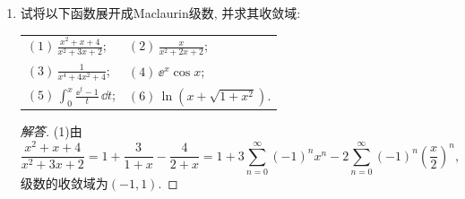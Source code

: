\begin{quiza}
\begin{enumerate}
\begin{proof}[解答]
其形式求导级数为
\[
\sum_{n=1}^{\infty}na_nx^{n-1}
=\sum_{n=1}^{\infty}\frac{(-1)^{n-1}}{n}x^{n-1}.
\]
当 \(x=1\) 时为交错调和级数, 收敛; 当 \(x=-1\) 时为
\[
-\sum_{n=1}^{\infty}\frac1n,
\]
发散. 因此该导数级数的收敛域正是 \(\left(-1,1\right]\).

(3)这样的 \(k\) 最大为 \(1\).

先说明 \(k=1\) 可达到. 取(\(n\ge2\))
\[
a_n=\frac{(-1)^n}{n\ln n},
\]
前若干项任意补齐. 该级数收敛半径为 \(1\).

在 \(x=1\) 处,
\[
\sum_{n=2}^{\infty}\frac{(-1)^n}{n\ln n}
\]
按Leibniz判别收敛; 在 \(x=-1\) 处,
\[
\sum_{n=2}^{\infty}\frac{1}{n\ln n}
\]
发散, 所以原收敛域为 \(\left(-1,1\right]\).

一次求导后在 \(x=1\) 处得到
\[
\sum_{n=2}^{\infty}\frac{(-1)^n}{\ln n},
\]
仍按Leibniz判别收敛; 在 \(x=-1\) 处得到
\[
-\sum_{n=2}^{\infty}\frac1{\ln n},
\]
发散. 因而一次求导后收敛域仍为 \(\left(-1,1\right]\).

再证 \(k\ge2\) 不可能. 若 \(k\) 次形式导数在 \(x=1\) 处收敛, 则其一般项必趋于0:
\[
n(n-1)\cdots(n-k+1)a_n\to0.
\]
故存在常数 \(C\) 与充分大 \(n\), 使
\[
|a_n|\le \frac{C}{n(n-1)\cdots(n-k+1)}\le \frac{2C}{n^k}.
\]
当 \(k\ge2\) 时有 \(\sum|a_n|<\infty\), 从而原级数在 \(x=-1\) 处绝对收敛, 这与原收敛域是 \(\left(-1,1\right]\) (即在 \(-1\) 处发散) 矛盾.

故最大可能值为
\[
k_{\max}=1.
\]
\end{proof}
\item 试将以下函数展开成Maclaurin级数, 并求其收敛域:
\begin{center}
\begin{tabular}{ll}
\((1)\,\frac{x^2+x+4}{x^2+3x+2}\);&\((2)\,\frac{x}{x^2+2x+2}\);\\
\((3)\,\frac{1}{x^4+4x^2+4}\);&\((4)\,\ee^x\cos x\);\\
\((5)\,\int_{0}^{x}\frac{\ee^t-1}{t}\,\dd t\);&\((6)\,\ln(x+\sqrt{1+x^2})\).
\end{tabular}
\end{center}
\begin{proof}[解答]
(1)由\[\frac{x^2+x+4}{x^2+3x+2}=1+\frac{3}{1+x}-\frac{4}{2+x}
=1+3\sum_{n=0}^{\infty}(-1)^nx^n-2\sum_{n=0}^{\infty}(-1)^n\left(\frac{x}{2}\right)^n,\]
级数的收敛域为\((-1,1)\).


\end{proof}
\end{enumerate}
\end{quiza}
